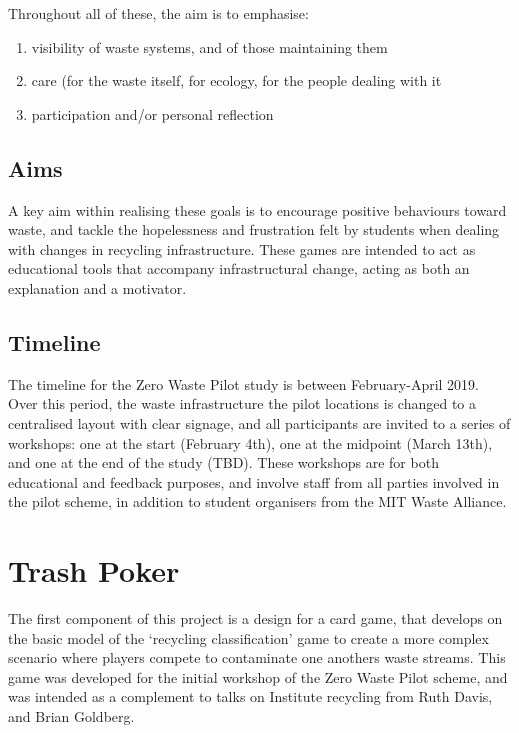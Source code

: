 \documentclass[nofonts,nols,justified,nobib]{tufte-book}
\begin{document}
Throughout all of these, the aim is to emphasise: 
\begin{enumerate}
\item visibility of waste systems, and of those maintaining them 
\item care (for the waste itself, for ecology, for the people dealing with it 
\item participation and/or personal reflection
\end{enumerate}

\subsection*{Aims}

A key aim within realising these goals is to encourage positive behaviours toward waste, and tackle the hopelessness and frustration felt by students when dealing with changes in recycling infrastructure. These games are intended to act as educational tools that accompany infrastructural change, acting as both an explanation and a motivator.

\subsection*{Timeline}

The timeline for the Zero Waste Pilot study is between February-April 2019. Over this period, the waste infrastructure the pilot locations is changed to a centralised layout with clear signage, and all participants are invited to a series of workshops: one at the start (February 4th), one at the midpoint (March 13th), and one at the end of the study (TBD). These workshops are for both educational and feedback purposes, and involve staff from all parties involved in the pilot scheme, in addition to student organisers from the MIT Waste Alliance.

\section*{Trash Poker}

The first component of this project is a design for a card game, that develops on the basic model of the `recycling classification' game to create a more complex scenario where players compete to contaminate one anothers waste streams. This game was developed for the initial workshop of the Zero Waste Pilot scheme, and was intended as a complement to talks on Institute recycling from Ruth Davis, and Brian Goldberg.
\end{document}
